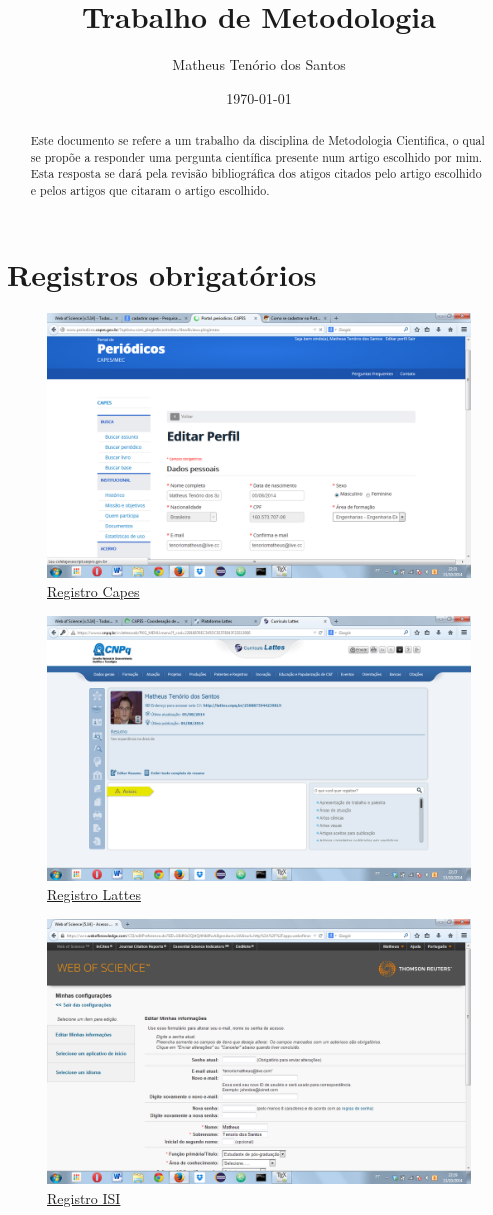 \documentclass[a4paper]{article}
\title{Trabalho de Metodologia}
\author{Matheus Tenório dos Santos}
\date{\today}
\begin{document}
\maketitle


\begin{abstract}

Este documento se refere a um trabalho da disciplina de Metodologia Cientifica, o qual se propõe a responder uma pergunta científica presente num artigo escolhido por mim. Esta resposta se dará pela revisão bibliográfica dos atigos citados pelo artigo escolhido e pelos artigos que citaram o artigo escolhido.

\end{abstract}


\section{Registros obrigatórios}


\begin{figure}[!h]
	\centering
	\includegraphics[width=.3\linewidth]{capes.png}
	\caption{\href{./capes.png}{Registro Capes}}
	\label{fig:capes}
\end{figure}

\begin{figure}[!h]
	\centering
  	\includegraphics[width=.3\linewidth]{lattes.png}
  	\caption{\href{./lattes.png}{Registro Lattes}}
  	\label{fig:lattes}
\end{figure}

\begin{figure}[!h]
	\centering
	\includegraphics[width=.3\linewidth]{ISI.png}
	\caption{\href{./ISI.png}{Registro ISI}}
	\label{fig:ISI}
\end{figure}
\end{document}
